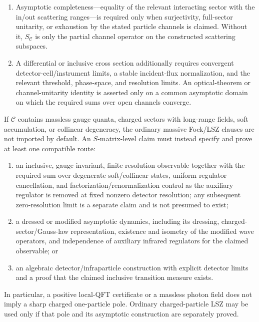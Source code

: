 \documentclass[12pt,a4paper]{article}
\begin{document}
\begin{definition}
\begin{enumerate}[label=\textnormal{(SM\arabic*)},leftmargin=3.2em]
      meromorphic continuation to the named sheet.  This is additional to the
      correlator/resolvent continuation used to locate a spectral resonance.
\item Asymptotic completeness---equality of the relevant interacting sector
      with the in/out scattering ranges---is required only when surjectivity,
      full-sector unitarity, or exhaustion by the stated particle channels is
      claimed.  Without it, \(S_{\mathcal C}\) is only the partial channel
      operator on the constructed scattering subspaces.
\item A differential or inclusive cross section additionally requires
      convergent detector-cell/instrument limits, a stable incident-flux
      normalization, and the relevant threshold, phase-space, and
      resolution limits.  An optical-theorem or channel-unitarity identity is
      asserted only on a common asymptotic domain on which the required sums
      over open channels converge.
\end{enumerate}
\end{definition}

\begin{definition}
\label{p12:def:claim-indexed-infrared-package}
If \(\mathcal C\) contains massless gauge quanta, charged sectors with
long-range fields, soft accumulation, or collinear degeneracy, the ordinary
massive Fock/LSZ clauses are not imported by default.  An \(S\)-matrix-level
claim must instead specify and prove at least one compatible route:
\begin{enumerate}[label=\textnormal{(IR\arabic*)},leftmargin=3em]
\item an inclusive, gauge-invariant, finite-resolution observable together
      with the required sum over degenerate soft/collinear states, uniform
      regulator cancellation, and factorization/renormalization control as the
      auxiliary regulator is removed at fixed nonzero detector resolution;
      any subsequent zero-resolution limit is a separate claim and is not
      presumed to exist;
\item a dressed or modified asymptotic dynamics, including its dressing,
      charged-sector/Gauss-law representation, existence and isometry of the
      modified wave operators, and independence of auxiliary infrared
      regulators for the claimed observable; or
\item an algebraic detector/infraparticle construction with explicit detector
      limits and a proof that the claimed inclusive transition measure exists.
\end{enumerate}
In particular, a positive local-QFT certificate or a massless photon field does
not imply a sharp charged one-particle pole.  Ordinary charged-particle LSZ may
be used only if that pole and its asymptotic construction are separately proved.
\end{definition}
\end{document}
